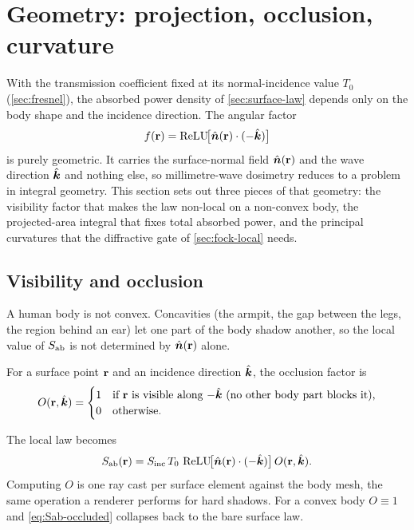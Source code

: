 \section{Geometry: projection, occlusion, curvature}\label{sec:geom}

With the transmission coefficient fixed at its normal-incidence value $T_0$
(\cref{sec:fresnel}), the absorbed power density of \cref{sec:surface-law}
depends only on the body shape and the incidence direction. The angular factor
\begin{equation}\label{eq:geom-f}
  f(\mathbf{r}) = \operatorname{ReLU}\!\bigl[\hat{\bm{n}}(\mathbf{r})\cdot(-\hat{\bm{k}})\bigr]
\end{equation}
is purely geometric. It carries the surface-normal field $\hat{\bm{n}}(\mathbf{r})$ and the
wave direction $\hat{\bm{k}}$ and nothing else, so millimetre-wave dosimetry reduces to
a problem in integral geometry. This section sets out three pieces of that
geometry: the visibility factor that makes the law non-local on a non-convex
body, the projected-area integral that fixes total absorbed power, and the
principal curvatures that the diffractive gate of \cref{sec:fock-local} needs.

\subsection{Visibility and occlusion}\label{sec:geom-occlusion}

A human body is not convex. Concavities (the armpit, the gap between the legs,
the region behind an ear) let one part of the body shadow another, so the local
value of $S_{\mathrm{ab}}$ is not determined by $\hat{\bm{n}}(\mathbf{r})$ alone.

\begin{definition}\label{def:occlusion}
For a surface point $\mathbf{r}$ and an incidence direction $\hat{\bm{k}}$, the occlusion
factor is
\begin{equation}\label{eq:O-def}
  O(\mathbf{r},\hat{\bm{k}}) = \begin{cases}
    1 & \text{if $\mathbf{r}$ is visible along $-\hat{\bm{k}}$ (no other body part blocks it),}\\
    0 & \text{otherwise.}
  \end{cases}
\end{equation}
\end{definition}

The local law becomes
\begin{equation}\label{eq:Sab-occluded}
  S_{\mathrm{ab}}(\mathbf{r}) = S_{\mathrm{inc}}\,T_0\,\operatorname{ReLU}\!\bigl[\hat{\bm{n}}(\mathbf{r})\cdot(-\hat{\bm{k}})\bigr]\,O(\mathbf{r},\hat{\bm{k}}).
\end{equation}
Computing $O$ is one ray cast per surface element against the body mesh, the same
operation a renderer performs for hard shadows. For a convex body $O\equiv 1$ and
\cref{eq:Sab-occluded} collapses back to the bare surface law.

